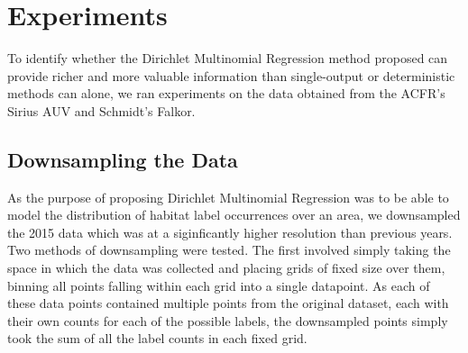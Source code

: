 \chapter{Experiments} \label{chap:experiments}

To identify whether the Dirichlet Multinomial Regression method proposed can provide richer and more valuable information than single-output or deterministic methods can alone, we ran experiments on the data obtained from the ACFR's Sirius AUV and Schmidt's Falkor.

\section{Downsampling the Data}
As the purpose of proposing Dirichlet Multinomial Regression was to be able to model the distribution of habitat label occurrences over an area, we downsampled the 2015 data which was at a siginficantly higher resolution than previous years. Two methods of downsampling were tested. The first involved simply taking the space in which the data was collected and placing grids of fixed size over them, binning all points falling within each grid into a single datapoint. As each of these data points contained multiple points from the original dataset, each with their own counts for each of the possible labels, the downsampled points simply took the sum of all the label counts in each fixed grid.
